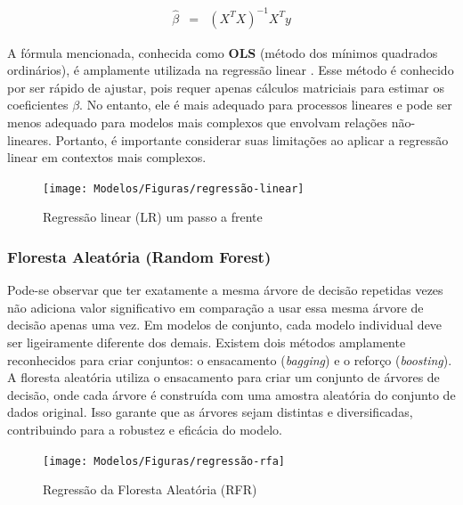 \begin{eqnarray}
	\hat{\beta}&=&\left(X^T X\right)^{-1} X^T y\label{eq:ols}
\end{eqnarray}

A fórmula mencionada, conhecida como \textbf{OLS} (método dos mínimos quadrados ordinários), é amplamente utilizada na regressão linear . Esse método é conhecido por ser rápido de ajustar, pois requer apenas cálculos matriciais para estimar os coeficientes $\beta$. No entanto, ele é mais adequado para processos lineares e pode ser menos adequado para modelos mais complexos que envolvam relações não-lineares. Portanto, é importante considerar suas limitações ao aplicar a regressão linear em contextos mais complexos.

\begin{figure}[H]
	\centering
	\caption{Regressão linear (LR) um passo a frente}
	\label{fig:1-regressao-linear}
	\texttt{[image: Modelos/Figuras/regressão-linear]}
	
\end{figure}


\subsubsection{Floresta Aleat\'oria (Random Forest)} \label{subsubsec:rf}

Pode-se observar que ter exatamente a mesma árvore de decisão repetidas vezes não adiciona valor significativo em comparação a usar essa mesma árvore de decisão apenas uma vez. Em modelos de conjunto, cada modelo individual deve ser ligeiramente diferente dos demais. Existem dois métodos amplamente reconhecidos para criar conjuntos: o ensacamento (\textit{bagging}) e o reforço (\textit{boosting}). A floresta aleatória utiliza o ensacamento para criar um conjunto de árvores de decisão, onde cada árvore é construída com uma amostra aleatória do conjunto de dados original. Isso garante que as árvores sejam distintas e diversificadas, contribuindo para a robustez e eficácia do modelo.


\begin{figure}[H]
	\centering
	\caption{Regressão da Floresta Aleatória (RFR)}
	\label{fig:1-regressao-rfa}
	\texttt{[image: Modelos/Figuras/regressão-rfa]}
	
\end{figure}


